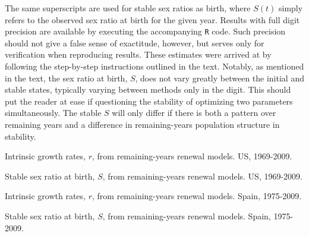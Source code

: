 The same superscripts are used for stable sex ratios as birth, where $S(t)$
simply refers to the observed sex ratio at birth for the given year. Results
with full digit precision are available by executing the accompanying \texttt{R}
code. Such precision should not give a false sense of exactitude, however, but
serves only for verification when reproducing results. These estimates were
arrived at by following the step-by-step instructions outlined in the text.
Notably, as mentioned in the text, the sex ratio at birth, $S$, does not vary
greatly between the initial and stable states, typically varying between
methods only in the  digit. This should put the reader at ease if
questioning the stability of optimizing two parameters simultaneously. The
stable $S$ will only differ if there is both a pattern over remaining years
and a difference in remaining-years population structure in stability.

\begin{table}
  \begin{adjustwidth}{-1in}{-.5in}
  \centering
    \caption{Intrinsic growth rates, $r$, from remaining-years renewal models.
    US, 1969-2009.}
    \label{tab:USexALL}
        \small{}
  \end{adjustwidth}
\end{table}

\begin{table}
  \begin{adjustwidth}{-1in}{-.5in}
  \centering
    \caption{Stable sex ratio at birth, $S$, from remaining-years renewal
    models. US, 1969-2009.}
    \label{tab:USexSRBALL}
        \small{}
  \end{adjustwidth}
\end{table}

\begin{table}
  \begin{adjustwidth}{-1in}{-.5in}
  \centering
    \caption{Intrinsic growth rates, $r$, from remaining-years renewal models.
    Spain, 1975-2009.}
    \label{tab:ESexALL}
        \small{}
  \end{adjustwidth}
\end{table}

\begin{table}
  \begin{adjustwidth}{-1in}{-.5in}
  \centering
    \caption{Stable sex ratio at birth, $S$, from remaining-years renewal
    models. Spain, 1975-2009.}
    \label{tab:ESexSRBALL}
        \small{}
  \end{adjustwidth}
\end{table}












